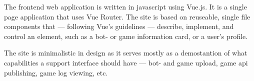 	The frontend web application is written in javascript using Vue.js. It is a single page application that uses Vue Router. 
	The site is based on reuseable, single file components that --- following Vue's guidelines --- describe, implement, and control an element, such as a bot- or game information card, or a user's profile.
	
	The site is minimalistic in design as it serves mostly as a demostantion of what capabilities a support interface should have --- bot- and game upload, game api publishing, game log viewing, etc.

%













